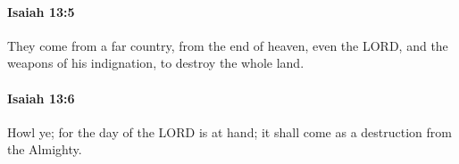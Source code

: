 		\paragraph{Isaiah 13:5} %
			\label{ISAIAH-13-5}

			They come from a far country, from the end of heaven, even the LORD, and the weapons of his indignation, to destroy the whole land.


		\paragraph{Isaiah 13:6} %
			\label{ISAIAH-13-6}

			Howl ye; for the day of the LORD is at hand; it shall come as a destruction from the Almighty.


